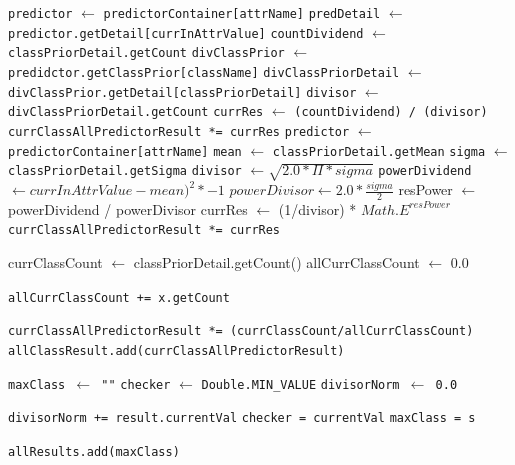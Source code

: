 \begin{enumerate}
\begin{itemize}
\begin{enumerate}
\begin{algorithm}[H]
\begin{algorithmic}[1]
							\State \texttt{predictor} $\gets$ \texttt{predictorContainer[attrName]}
							\State \texttt{predDetail} $\gets$ \texttt{predictor.getDetail[currInAttrValue]}
							\State \texttt{countDividend} $\gets$ \texttt{classPriorDetail.getCount}
							\State \texttt{divClassPrior} $\gets$ \texttt{predidctor.getClassPrior[className]}
							\State \texttt{divClassPriorDetail} $\gets$ \texttt{divClassPrior.getDetail[classPriorDetail]}
							\State \texttt{divisor} $\gets$ \texttt{divClassPriorDetail.getCount}
							\State \texttt{currRes} $\gets$ \texttt{(countDividend) / (divisor)}
							\State \texttt{currClassAllPredictorResult *= currRes}
							\State \texttt{predictor} $\gets$ \texttt{predictorContainer[attrName]}
							\State \texttt{mean} $\gets$ \texttt{classPriorDetail.getMean}
							\State \texttt{sigma} $\gets$ \texttt{classPriorDetail.getSigma}
							\State \texttt{divisor} $\gets \sqrt{2.0 * \Pi * sigma}$
							\State \texttt{powerDividend} $\gets currInAttrValue - mean)^2 * -1$
							\State $powerDivisor \gets 2.0 * \frac{sigma}{2}$
							\State resPower $\gets$ powerDividend / powerDivisor
							\State currRes $\gets$ (1/divisor) * $Math.E^{resPower}$
							\State \texttt{currClassAllPredictorResult *= currRes}
						\EndIf
						
						\State currClassCount $\gets$ classPriorDetail.getCount()
						\State allCurrClassCount $\gets$ 0.0

							\State \texttt{allCurrClassCount += x.getCount}
						\EndFor
												
						\State \texttt{currClassAllPredictorResult *= (currClassCount/allCurrClassCount)}
						\State \texttt{allClassResult.add(currClassAllPredictorResult)}
					\EndFor					
					
				\EndFor
				
				\State \texttt{maxClass $\gets$ ""}
				\State \texttt{checker} $\gets$ \texttt{Double.MIN}\verb|_|\texttt{VALUE}
				\State \texttt{divisorNorm $\gets$ 0.0}
				
					\State \texttt{divisorNorm += result.currentVal}
						\State \texttt{checker = currentVal}
          				\State \texttt{maxClass = s}
					\EndIf
				\EndFor
				
				\State \texttt{allResults.add(maxClass)}
				

\end{algorithmic}
\end{algorithm}
\end{enumerate}
\end{itemize}
\end{enumerate}
